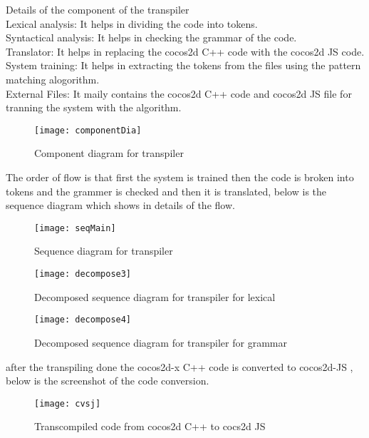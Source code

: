 \documentclass[23pt]{article}
\begin{document}
{\Large Details of the component of the transpiler  \\
  Lexical analysis: It helps in dividing the code into tokens. \\
  Syntactical analysis: It helps in checking the grammar of the code. \\
  Translator: It helps in replacing the cocos2d C++ code with the cocos2d JS code. \\
  System training: It helps in extracting the tokens from the files using the pattern matching alogorithm. \\
  External Files: It maily contains the cocos2d C++ code and cocos2d JS file for tranning the system with the algorithm. \\
    \par}

\newpage

\begin{figure}[h]
\caption{Component diagram for transpiler}
\centering
\texttt{[image: componentDia]}
\end{figure}


\newpage

{\Large The order of flow is that first the system is trained then the code is broken into tokens and the grammer is checked and then it is translated, below is the sequence diagram which shows in details of the flow. \par}

\begin{figure}[h]
\caption{Sequence diagram for transpiler}
\centering
\texttt{[image: seqMain]}
\end{figure}

\newpage

\begin{figure}[h]
\caption{Decomposed sequence diagram for transpiler for lexical}
\centering
\texttt{[image: decompose3]}
\end{figure}

\begin{figure}[h]
\caption{Decomposed sequence diagram for transpiler for grammar}
\centering
\texttt{[image: decompose4]}
\end{figure}

{\Large after the transpiling done the cocos2d-x C++ code is converted to cocos2d-JS , below is the screenshot of the code conversion. \par}
\begin{figure}[h]
\caption{Transcompiled code from cocos2d C++ to cocs2d JS}
\centering
\texttt{[image: cvsj]}
\end{figure}
\end{document}
